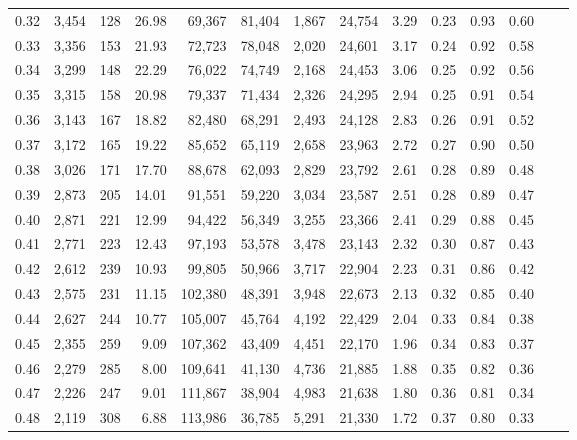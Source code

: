 \begin{tabular}{rrrrrrrrrrrrrr}
0.32 &  3,454 &  128 &   26.98 &   69,367 &   81,404 &   1,867 &  24,754 &   3.29 &  0.23 &  0.93 &      0.60 \\
0.33 &  3,356 &  153 &   21.93 &   72,723 &   78,048 &   2,020 &  24,601 &   3.17 &  0.24 &  0.92 &      0.58 \\
0.34 &  3,299 &  148 &   22.29 &   76,022 &   74,749 &   2,168 &  24,453 &   3.06 &  0.25 &  0.92 &      0.56 \\
0.35 &  3,315 &  158 &   20.98 &   79,337 &   71,434 &   2,326 &  24,295 &   2.94 &  0.25 &  0.91 &      0.54 \\
0.36 &  3,143 &  167 &   18.82 &   82,480 &   68,291 &   2,493 &  24,128 &   2.83 &  0.26 &  0.91 &      0.52 \\
0.37 &  3,172 &  165 &   19.22 &   85,652 &   65,119 &   2,658 &  23,963 &   2.72 &  0.27 &  0.90 &      0.50 \\
0.38 &  3,026 &  171 &   17.70 &   88,678 &   62,093 &   2,829 &  23,792 &   2.61 &  0.28 &  0.89 &      0.48 \\
0.39 &  2,873 &  205 &   14.01 &   91,551 &   59,220 &   3,034 &  23,587 &   2.51 &  0.28 &  0.89 &      0.47 \\
0.40 &  2,871 &  221 &   12.99 &   94,422 &   56,349 &   3,255 &  23,366 &   2.41 &  0.29 &  0.88 &      0.45 \\
0.41 &  2,771 &  223 &   12.43 &   97,193 &   53,578 &   3,478 &  23,143 &   2.32 &  0.30 &  0.87 &      0.43 \\
0.42 &  2,612 &  239 &   10.93 &   99,805 &   50,966 &   3,717 &  22,904 &   2.23 &  0.31 &  0.86 &      0.42 \\
0.43 &  2,575 &  231 &   11.15 &  102,380 &   48,391 &   3,948 &  22,673 &   2.13 &  0.32 &  0.85 &      0.40 \\
0.44 &  2,627 &  244 &   10.77 &  105,007 &   45,764 &   4,192 &  22,429 &   2.04 &  0.33 &  0.84 &      0.38 \\
0.45 &  2,355 &  259 &    9.09 &  107,362 &   43,409 &   4,451 &  22,170 &   1.96 &  0.34 &  0.83 &      0.37 \\
0.46 &  2,279 &  285 &    8.00 &  109,641 &   41,130 &   4,736 &  21,885 &   1.88 &  0.35 &  0.82 &      0.36 \\
0.47 &  2,226 &  247 &    9.01 &  111,867 &   38,904 &   4,983 &  21,638 &   1.80 &  0.36 &  0.81 &      0.34 \\
0.48 &  2,119 &  308 &    6.88 &  113,986 &   36,785 &   5,291 &  21,330 &   1.72 &  0.37 &  0.80 &      0.33 \\

\end{tabular}
